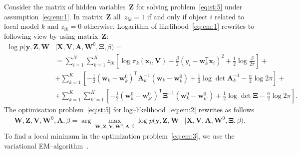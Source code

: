 \documentclass[12pt, twoside]{article}
\begin{document}
Consider the matrix of hidden variables~$\mathbf{Z}$ for solving problem~\eqref{eq:st:5} under assumption~\eqref{eq:em:1}. In matrix~$\mathbf{Z}$ all~$z_{ik} = 1$ if and only if object $i$ related to local model $k$ and $z_{ik} = 0$ otherwise.
Logarithm of likelihood~\eqref{eq:em:1} rewrites to following view by using matrix~$\mathbf{Z}$:
\[
\label{eq:em:2}
\begin{aligned}
\log p\bigr(\mathbf{y}, \mathbf{Z}, \mathbf{W}&|\mathbf{X}, \mathbf{V}, \textbf{A}, \textbf{W}^{0},  \bm{\Xi}, \beta\bigr) =\\
&= \sum_{i=1}^{N}\sum_{k=1}^{K}z_{ik}\left[\log\pi_k\left(\textbf{x}_i, \textbf{V}\right) - \frac{\beta}{2}\left(y_{i} - \textbf{w}_{k}^{\mathsf{T}}\textbf{x}_{i}\right)^{2} + \frac{1}{2}\log\frac{\beta}{2\pi}\right] +\\
&+ \sum_{k=1}^{K}\left[-\frac{1}{2}\left(\textbf{w}_{k} - \textbf{w}_{k}^{0}\right)^{\mathsf{T}}\textbf{A}_{k}^{-1}\left(\textbf{w}_{k} - \textbf{w}_{k}^{0}\right) + \frac{1}{2}\log\det\textbf{A}^{-1}_{k} - \frac{n}{2}\log2\pi\right]+\\
&+ \sum_{k=1}^{K}\sum_{k'=1}^{K}\left[-\frac{1}{2}\left(\textbf{w}_{k}^{0}-\textbf{w}_{k'}^{0}\right)^{\mathsf{T}}\bm{\Xi}^{-1}\left(\textbf{w}_{k}^{0}-\textbf{w}_{k'}^{0}\right) +\frac{1}{2}\log\det \bm{\Xi} -\frac{n}{2}\log{2\pi}\right].
\end{aligned}
\]
The optimisation problem~\eqref{eq:st:5} for log--likelihood~\eqref{eq:em:2} rewrites as follows
\[
\label{eq:em:3}
\begin{aligned}
\mathbf{W}, \mathbf{Z}, \mathbf{V}, \mathbf{W}^0, \textbf{A},  \beta = \arg\max_{\mathbf{W}, \mathbf{Z}, \mathbf{V}, \mathbf{W}^0, \textbf{A}, \beta} \log p\bigr(\mathbf{y}, \mathbf{Z}, \mathbf{W}&|\mathbf{X}, \mathbf{V}, \textbf{A}, \textbf{W}^{0}, \bm{\Xi}, \beta\bigr).
\end{aligned}
\]
To find a local minimum in the optimization problem~\eqref{eq:em:3}, we use the variational EM--algorithm~\cite{bishop2006}.
\end{document}
